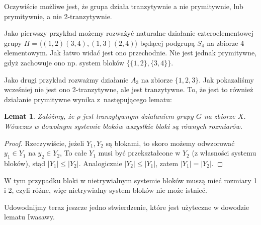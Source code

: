 \documentclass[licencjacka]{pracamgr}
\newtheorem{lemma}{Lemat}[section]
\begin{document}
Oczywiście możliwe jest, że grupa działa tranzytywnie a nie
prymitywnie, lub prymitywnie, a nie 2-tranzytywnie.

Jako pierwszy przykład możemy rozważyć naturalne działanie
czteroelementowej grupy $H= \langle (1,2)(3,4), (1,3)(2,4) \rangle$
będącej podgrupą $S_4$ na zbiorze 4 elementowym. Jak łatwo widać
jest ono przechodnie. Nie jest jednak prymitywne, gdyż zachowuje ono
np. system bloków $\{\{1,2\}, \{3,4\}\}$.

Jako drugi przykład rozważmy działanie $A_3$ na zbiorze $\{1, 2,
3\}$. Jak pokazaliśmy wcześniej nie jest ono 2-tranzytywne, ale jest
tranzytywne. To, że jest to również działanie prymitywne wynika
z~następującego lematu:

\begin{lemma}
    Załóżmy, że $\rho$ jest tranzytywnym działaniem grupy $G$ na zbiorze $X$.
    Wówczas w dowolnym systemie bloków wszystkie bloki są równych rozmiarów.
\end{lemma}
\begin{proof}
Rzeczywiście, jeżeli $Y_1, Y_2$ są blokami, to skoro możemy
odwzorować $y_1 \in Y_1$ na $y_2 \in Y_2$, To całe $Y_1$ musi być
przekształcone w $Y_2$ (z własności systemu bloków), stąd $|Y_1| \le
|Y_2|$. Analogicznie $|Y_2| \le |Y_1|$, zatem $|Y_1| = |Y_2|$.
\end{proof}


W tym przypadku bloki w nietrywialnym systemie bloków muszą mieć
rozmiary 1 i 2, czyli różne, więc nietrywialny system bloków nie
może istnieć.

Udowodnijmy teraz jeszcze jedno stwierdzenie, które jest użyteczne w
dowodzie lematu Iwasawy.
\end{document}
